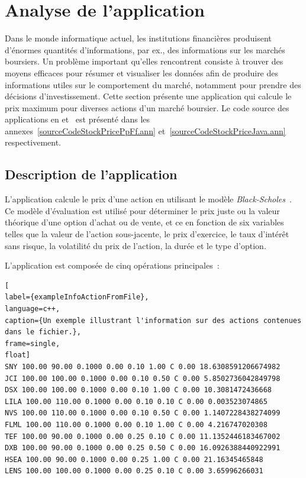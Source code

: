 \section{Analyse de l'application }
\label{stockprice.sect}

Dans le monde informatique actuel, les institutions financi\`eres produisent d'\'enormes quantit\'es d'informations, par ex., des informations sur les march\'es boursiers. Un probl\`eme important qu'elles rencontrent consiste \`a trouver des moyens efficaces pour r\'esumer et visualiser les donn\'ees afin de produire des informations utiles sur le comportement du march\'e, notamment pour prendre des d\'ecisions d'investissement. Cette section pr\'esente une application qui calcule le prix maximum pour diverses actions d'un marché boursier. Le code source des applications  en  et~ est pr\'esent\'e dans les annexes~\ref{sourceCodeStockPricePpFf.ann} et~\ref{sourceCodeStockPriceJava.ann} respectivement. 

\subsection{Description de l'application}

L'application  calcule le prix d'une action en utilisant le modèle \emph{Black-Scholes}~\citep{macbeth1979empirical}. Ce mod\`ele d'\'evaluation est utilis\'e pour d\'eterminer le prix juste ou la valeur th\'eorique d'une option d'achat ou de vente, et ce en fonction de six variables telles que la valeur de l'action sous-jacente, le prix d'exercice, le taux d'int\'er\^et sans risque, la volatilit\'e du prix de l'action, la dur\'ee et le type d'option. 

L'application  est compos\'ee de cinq op\'erations principales~: 

\begin{lstlisting}[
label={exampleInfoActionFromFile},
language=c++,
caption={Un exemple illustrant l'information sur des actions contenues dans le fichier.},
frame=single,
float]
SNY 100.00 90.00 0.1000 0.00 0.10 1.00 C 0.00 18.6308591206674982
JCI 100.00 100.00 0.1000 0.00 0.10 0.50 C 0.00 5.8502736042849798
DSX 100.00 100.00 0.1000 0.00 0.10 1.00 C 0.00 10.3081472436668
LILA 100.00 110.00 0.1000 0.00 0.10 0.10 C 0.00 0.003523074865
NVS 100.00 110.00 0.1000 0.00 0.10 0.50 C 0.00 1.1407228438274099
FLML 100.00 110.00 0.1000 0.00 0.10 1.00 C 0.00 4.216747020308
TEF 100.00 90.00 0.1000 0.00 0.25 0.10 C 0.00 11.1352446183467002
DXB 100.00 90.00 0.1000 0.00 0.25 0.50 C 0.00 16.0926388440922991
HSEA 100.00 90.00 0.1000 0.00 0.25 1.00 C 0.00 21.16345465848
LENS 100.00 100.00 0.1000 0.00 0.25 0.10 C 0.00 3.65996266031
\end{lstlisting}

